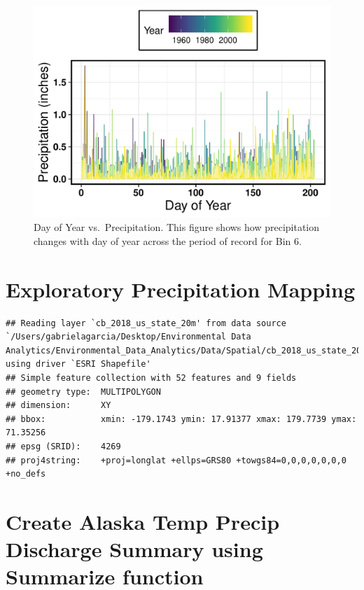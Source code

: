\documentclass[12pt,]{article}
\begin{document}
\begin{figure}
\centering
\includegraphics{Project_Report_v2_files/figure-latex/unnamed-chunk-3-1.pdf}
\caption{Day of Year vs.~Precipitation. This figure shows how
precipitation changes with day of year across the period of record for
Bin 6.}
\end{figure}

\hypertarget{exploratory-precipitation-mapping}{%
\section{Exploratory Precipitation
Mapping}\label{exploratory-precipitation-mapping}}

\begin{verbatim}
## Reading layer `cb_2018_us_state_20m' from data source `/Users/gabrielagarcia/Desktop/Environmental Data Analytics/Environmental_Data_Analytics/Data/Spatial/cb_2018_us_state_20m.shp' using driver `ESRI Shapefile'
## Simple feature collection with 52 features and 9 fields
## geometry type:  MULTIPOLYGON
## dimension:      XY
## bbox:           xmin: -179.1743 ymin: 17.91377 xmax: 179.7739 ymax: 71.35256
## epsg (SRID):    4269
## proj4string:    +proj=longlat +ellps=GRS80 +towgs84=0,0,0,0,0,0,0 +no_defs
\end{verbatim}

\hypertarget{create-alaska-temp-precip-discharge-summary-using-summarize-function}{%
\section{Create Alaska Temp Precip Discharge Summary using Summarize
function}\label{create-alaska-temp-precip-discharge-summary-using-summarize-function}}
\end{document}
